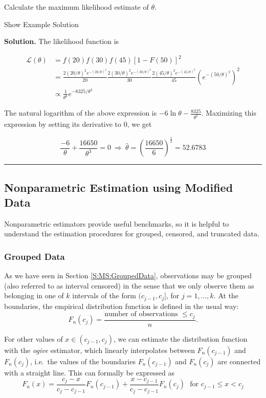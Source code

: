 \documentclass[]{book}
\theoremstyle{definition}
\theoremstyle{definition}
\theoremstyle{definition}
\theoremstyle{remark}
\begin{document}
Calculate the maximum likelihood estimate of \(\theta\).

Show Example Solution

\hypertarget{toggleExampleSelect.3.3}{}
\textbf{Solution.} The likelihood function is

\[
\begin{aligned} 
\mathcal{L}(\theta) &= f(20) f(30) f(45) [1-F(50)]^2 \\
&= \frac{2(20/\theta)^2 e^{-(20/\theta)^2}}{20} \frac{2(30/\theta)^2 e^{-(30/\theta)^2}}{30} \frac{2(45/\theta)^2 e^{-(45/\theta)^2}}{45}(e^{-(50/\theta)^2})^2 \\
&\propto \frac{1}{\theta^6} e^{-8325/\theta^2}
\end{aligned}
\]

The natural logarithm of the above expression is
\(-6\ln\theta - \frac{8325}{\theta^2}\). Maximizing this expression by
setting its derivative to 0, we get

\[\frac{-6}{\theta} + \frac{16650}{\theta^3} = 0 \ \Rightarrow \ \hat{\theta} = \left(\frac{16650}{6}\right)^{\frac{1}{2}} = 52.6783\]

\begin{center}\rule{0.5\linewidth}{\linethickness}\end{center}

\subsection{Nonparametric Estimation using Modified
Data}\label{nonparametric-estimation-using-modified-data}

Nonparametric estimators provide useful benchmarks, so it is helpful to
understand the estimation procedures for grouped, censored, and
truncated data.

\subsubsection{Grouped Data}\label{grouped-data}

As we have seen in Section \ref{S:MS:GroupedData}, observations may be
grouped (also referred to as interval censored) in the sense that we
only observe them as belonging in one of \(k\) intervals of the form
\((c_{j-1}, c_j]\), for \(j=1, \ldots, k\). At the boundaries, the
empirical distribution function is defined in the usual way: \[
F_n(c_j) = \frac{\text{number of observations } \le c_j}{n}.
\]

For other values of \(x \in (c_{j-1}, c_j)\), we can estimate the
distribution function with the \emph{ogive} estimator, which linearly
interpolates between \(F_n(c_{j-1})\) and \(F_n(c_j)\), i.e.~the values
of the boundaries \(F_n(c_{j-1})\) and \(F_n(c_j)\) are connected with a
straight line. This can formally be expressed as
\[F_n(x) = \frac{c_j-x}{c_j-c_{j-1}} F_n(c_{j-1}) + \frac{x-c_{j-1}}{c_j-c_{j-1}} F_n(c_j) \ \ \ \text{for } c_{j-1} \le x < c_j\]
\end{document}
